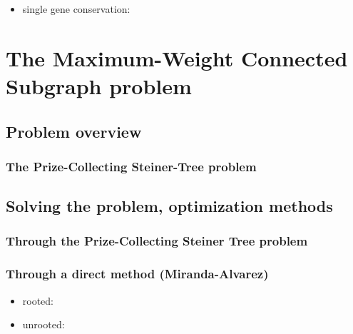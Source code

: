 		\begin{itemize}
			\item single gene conservation: \cite{van2003predicting}
		\end{itemize}

\section{The Maximum-Weight Connected Subgraph problem}

	\subsection{Problem overview}

		\subsubsection{The Prize-Collecting Steiner-Tree problem}

	\subsection{Solving the problem, optimization methods}

		\subsubsection{Through the Prize-Collecting Steiner Tree problem}

		\subsubsection{Through a direct method (Miranda-Alvarez)}

			\begin{itemize}
				\item rooted: \cite{alvarez2013rooted}
				\item unrooted: \cite{alvarez2013maximum}
			\end{itemize}


